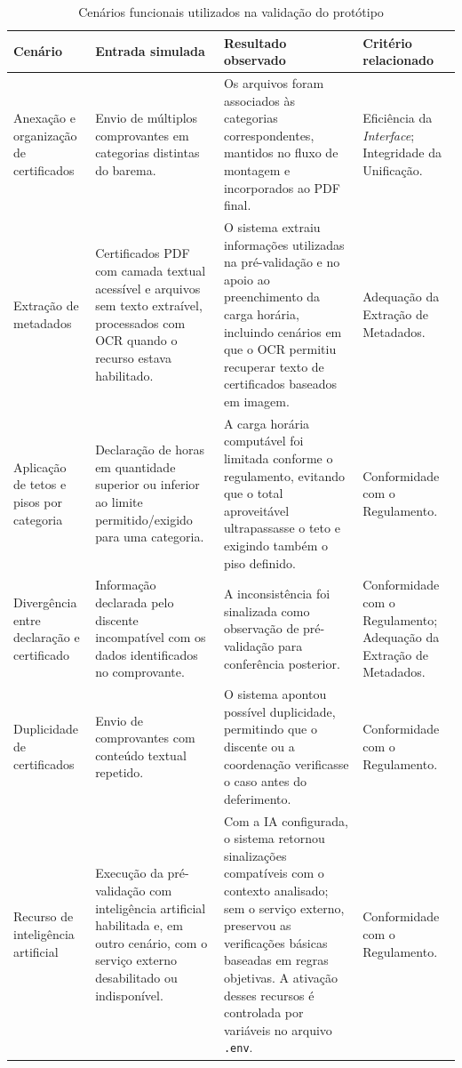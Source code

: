 \begin{table}[H]
\centering
\scriptsize
\setlength{\tabcolsep}{2.8pt}
\renewcommand{\arraystretch}{1.22}
\caption{Cenários funcionais utilizados na validação do protótipo}
\label{tab:cenarios-validacao}
\begin{tabularx}{\textwidth}{>{\raggedright\arraybackslash}p{2.1cm}>{\raggedright\arraybackslash}X>{\raggedright\arraybackslash}X>{\raggedright\arraybackslash}p{2.6cm}}
\toprule
\textbf{Cenário} & \textbf{Entrada simulada} & \textbf{Resultado observado} & \textbf{Critério relacionado} \\
\midrule
Anexação e organização de certificados & Envio de múltiplos comprovantes em categorias distintas do barema. & Os arquivos foram associados às categorias correspondentes, mantidos no fluxo de montagem e incorporados ao PDF final. & Eficiência da \textit{Interface}; Integridade da Unificação. \\
Extração de metadados & Certificados PDF com camada textual acessível e arquivos sem texto extraível, processados com OCR quando o recurso estava habilitado. & O sistema extraiu informações utilizadas na pré-validação e no apoio ao preenchimento da carga horária, incluindo cenários em que o OCR permitiu recuperar texto de certificados baseados em imagem. & Adequação da Extração de Metadados. \\
Aplicação de tetos e pisos por categoria & Declaração de horas em quantidade superior ou inferior ao limite permitido/exigido para uma categoria. & A carga horária computável foi limitada conforme o regulamento, evitando que o total aproveitável ultrapassasse o teto e exigindo também o piso definido. & Conformidade com o Regulamento. \\
Divergência entre declaração e certificado & Informação declarada pelo discente incompatível com os dados identificados no comprovante. & A inconsistência foi sinalizada como observação de pré-validação para conferência posterior. & Conformidade com o Regulamento; Adequação da Extração de Metadados. \\
Duplicidade de certificados & Envio de comprovantes com conteúdo textual repetido. & O sistema apontou possível duplicidade, permitindo que o discente ou a coordenação verificasse o caso antes do deferimento. & Conformidade com o Regulamento. \\
Recurso de inteligência artificial & Execução da pré-validação com inteligência artificial habilitada e, em outro cenário, com o serviço externo desabilitado ou indisponível. & Com a IA configurada, o sistema retornou sinalizações compatíveis com o contexto analisado; sem o serviço externo, preservou as verificações básicas baseadas em regras objetivas. A ativação desses recursos é controlada por variáveis no arquivo \texttt{.env}. & Conformidade com o Regulamento. \\

\end{tabularx}
\end{table}
